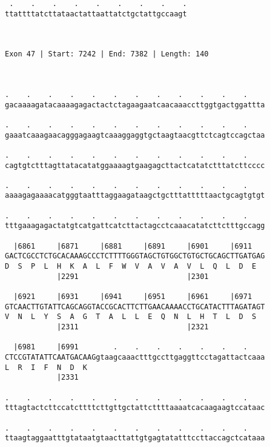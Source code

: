 \documentclass{article}
\begin{document}
\begin{Verbatim}
 .    .    .    .    .    .    .    .    .
ttattttatcttataactattaattatctgctattgccaagt
                                          
                                          
 
Exon 47 | Start: 7242 | End: 7382 | Length: 140



.    .    .    .    .    .    .    .    .    .    .    .    
gacaaaagatacaaaagagactactctagaagaatcaacaaaccttggtgactggattta
                                                            
.    .    .    .    .    .    .    .    .    .    .    .    
gaaatcaaagaacagggagaagtcaaaggaggtgctaagtaacgttctcagtccagctaa
                                                            
.    .    .    .    .    .    .    .    .    .    .    .    
cagtgtctttagttatacatatggaaaagtgaagagcttactcatatctttatcttcccc
                                                            
.    .    .    .    .    .    .    .    .    .    .    .    
aaaagagaaaacatgggtaatttaggaagataagctgctttatttttaactgcagtgtgt
                                                            
.    .    .    .    .    .    .    .    .    .    .    .    
tttgaaagagactatgtcatgattcatcttactagcctcaaacatatcttctttgccagg
                                                            
  |6861     |6871     |6881     |6891     |6901     |6911   
GACTCGCCTCTGCACAAAGCCCTCTTTTGGGTAGCTGTGGCTGTGCTGCAGCTTGATGAG
D  S  P  L  H  K  A  L  F  W  V  A  V  A  V  L  Q  L  D  E  
            |2291                         |2301             
  
  |6921     |6931     |6941     |6951     |6961     |6971   
GTCAACTTGTATTCAGCAGGTACCGCACTTCTTGAACAAAACCTGCATACTTTAGATAGT
V  N  L  Y  S  A  G  T  A  L  L  E  Q  N  L  H  T  L  D  S  
            |2311                         |2321             
  
  |6981     |6991        .    .    .    .    .    .    .    
CTCCGTATATTCAATGACAAGgtaagcaaactttgccttgaggttcctagattactcaaa
L  R  I  F  N  D  K                                         
            |2331                                           
  
.    .    .    .    .    .    .    .    .    .    .    .    
tttagtactcttccatcttttcttgttgctattcttttaaaatcacaagaagtccataac
                                                            
.    .    .    .    .    .    .    .    .    .    .    .    
ttaagtaggaatttgtataatgtaacttattgtgagtatatttccttaccagctcataaa
                                                            

\end{Verbatim}
\end{document}
